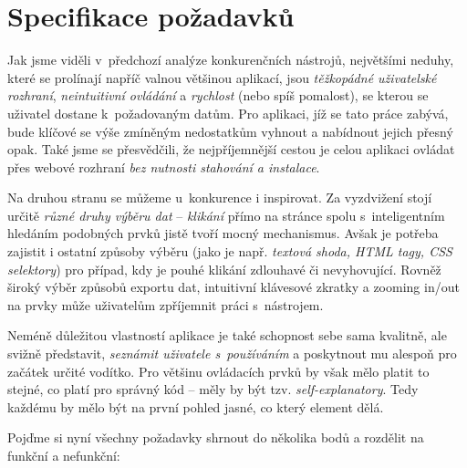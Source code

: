 \documentclass[thesis=B,czech]{FITthesis}[2012/06/26]
\begin{document}
\newpage
\section{Specifikace požadavků}
Jak jsme viděli v~předchozí analýze konkurenčních nástrojů, největšími neduhy, které se prolínají napříč valnou většinou aplikací, jsou \emph{těžkopádné uživatelské rozhraní}, \emph{neintuitivní ovládání} a \emph{rychlost} (nebo spíš pomalost), se kterou se uživatel dostane k~požadovaným datům. Pro aplikaci, jíž se tato práce zabývá, bude klíčové se výše zmíněným nedostatkům vyhnout a nabídnout jejich přesný opak. Také jsme se přesvědčili, že nejpříjemnější cestou je celou aplikaci ovládat přes webové rozhraní  \emph{bez nutnosti stahování a instalace}.

Na druhou stranu se můžeme u~konkurence i inspirovat. Za vyzdvižení stojí určitě \emph{různé druhy výběru dat} -- \emph{klikání} přímo na stránce spolu s~inteligentním hledáním podobných prvků jistě tvoří mocný mechanismus. Avšak je potřeba zajistit i ostatní způsoby výběru (jako je např. \emph{textová shoda, HTML tagy, CSS selektory}) pro případ, kdy je pouhé klikání zdlouhavé či nevyhovující. Rovněž široký výběr způsobů exportu dat, intuitivní klávesové zkratky a zooming in/out na prvky může uživatelům zpříjemnit práci s~nástrojem.

Neméně důležitou vlastností aplikace je také schopnost sebe sama kvalitně, ale svižně představit, \emph{seznámit uživatele s~používáním} a poskytnout mu alespoň pro začátek určité vodítko. Pro většinu ovládacích prvků by však mělo platit to stejné, co platí pro správný kód -- měly by být tzv. \emph{self-explanatory}. Tedy každému by mělo být na první pohled jasné, co který element dělá.

Pojďme si nyní všechny požadavky shrnout do několika bodů a rozdělit na funkční a nefunkční:
\end{document}
